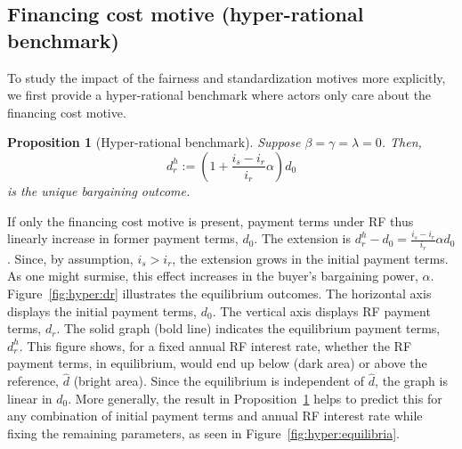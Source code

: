 \documentclass[a4paper,11pt]{article}
\newcommand{\dref}{\widehat d}
\newcommand{\dHyp}{d^h_r}
\renewcommand{\~}[1]{\tilde{#1}}
\renewcommand{\-}[1]{\overline{#1}}
\newtheorem{proposition}{Proposition}
\begin{document}
\subsection{Financing cost motive (hyper-rational benchmark)}
To study the impact of the fairness and standardization motives more explicitly, we first provide a hyper-rational benchmark where actors only care about the financing cost motive.%
\begin{proposition}[Hyper-rational benchmark]\label{prop:hyper}\singlespacing
    Suppose $\beta=\gamma=\lambda=0$. Then,
    \begin{equation}
        \dHyp := \left(1+\frac{i_s-i_r}{i_r}\alpha\right)d_0
    \end{equation}
    is the unique bargaining outcome.
\end{proposition}%
%
If only the financing cost motive is present, payment terms under RF thus linearly increase in former payment terms, $d_0$. The extension is $\dHyp - d_0 = \frac{i_s-i_r}{i_r}\alpha d_0$. Since, by assumption, $i_s>i_r$, the extension grows in the initial payment terms. As one might surmise, this effect increases in the buyer's bargaining power, $\alpha$. Figure~\ref{fig:hyper:dr} illustrates the equilibrium outcomes. The horizontal axis displays the initial payment terms, $d_0$. The vertical axis displays RF payment terms, $d_r$. The solid graph (bold line) indicates the equilibrium payment terms, $\dHyp$. This figure shows, for a fixed annual RF interest rate, whether the RF payment terms, in equilibrium, would end up below (dark area) or above the reference, $\dref$ (bright area). Since the equilibrium is independent of $\dref$, the graph is linear in $d_0$. More generally, the result in Proposition~\ref{prop:hyper} helps to predict this for any combination of initial payment terms and annual RF interest rate while fixing the remaining parameters, as seen in Figure~\ref{fig:hyper:equilibria}.
\end{document}

